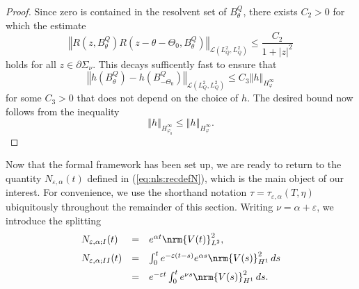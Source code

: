 \documentclass[10pt]{articleHJ}
\newcommand{\e}{\ensuremath{\varepsilon}}
\DeclarePairedDelimiter{\nrm}\lVert\rVert
\newcommand{\abs}[1]{\left\vert#1\right\vert}			%
\newcommand{\norm}[1]{\left\Vert#1\right\Vert}		%
\newcommand{\sref}[1]{(\ref{#1})}                       %
\numberwithin{equation}{section}
\begin{document}
\begin{proof}
Since zero is contained in the resolvent set of $B^Q_\theta$,
there exists $C_2 > 0$ for which
the estimate
\begin{equation}
\norm{R(z, B^Q_{\theta}) R(z - \theta - \Theta_0, B^Q_{\theta}) }_{\mathcal{L}(L^2_Q , L^2_Q)}
\le  \frac{C_2}{1 + \abs{z}^2}
\end{equation}
holds for all $z \in \partial \Sigma_{\nu}$.
This decays sufficently fast to ensure that
\begin{equation}
\norm{h(B^Q_{\theta} ) - h(B^Q_{-\Theta_0})}_{\mathcal{L}(L^2_Q , L^2_Q)} \le
C_3 \norm{h}_{H^\infty_{\varphi} }
\end{equation}
for some $C_3 > 0$ that does not depend on the choice of $h$.
The desired bound now follows from the inequality
\begin{equation}
\norm{h}_{H^\infty_{\varphi_0}} \le \norm{h}_{H^\infty_{\varphi}}.
\end{equation}
\end{proof}


Now that the formal framework has been set up, we are ready to
return to the quantity $N_{\e,\alpha}(t)$ defined in \sref{eq:nls:recdefN},
which is the main object of our interest.
For convenience, we use the shorthand notation
$\tau = \tau_{\e, \alpha}(T, \eta)$ ubiquitously
throughout the remainder of this section.
Writing $\nu = \alpha + \e$,
we introduce the splitting
\begin{equation}
\begin{array}{lcl}
N_{\e,\alpha;I}(t)
  & = & e^{\alpha t} \nrm{ V(t) }_{L^2}^2 ,
\\[0.2cm]
N_{\e,\alpha;II}(t)
 & = &
   \int_0^t e^{-\e(t-s)} e^{\alpha s}
       \nrm{V(s)}_{H^1}^2 \, ds
\\[0.2cm]
 & = &
  e^{-\e t}
    \int_0^t e^{\nu s}
       \nrm{V(s)}_{H^1}^2 \, ds.
\end{array}
\end{equation}
\end{document}
